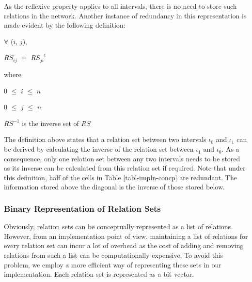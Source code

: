 \documentclass[11pt]{report}
\newenvironment{vquote}
{
  \begin{list}{}{\leftmargin 1em}\item[]
}
{
  \end{list}
}
\begin{document}
        As the reflexive property applies to all intervals, there is no need to
        store such relations in the network. Another instance of redundancy in
        this representation is made evident by the following definition:

        \begin{vquote}
          $\forall$ ($i$, $j$),

          $RS_{ij}$ $=$ $RS^{-1}_{ji}$

          where

          \hspace{1em}
          $0$ $\leq$ $i$ $\leq$ $n$

          \hspace{1em}
          $0$ $\leq$ $j$ $\leq$ $n$

          \hspace{1em}
          $RS^{-1}$ is the inverse set of $RS$
        \end{vquote}

        The definition above states that a relation set between two intervals
        $\iota_0$ and $\iota_1$ can be derived by calculating the inverse of
        the relation set between $\iota_1$ and $\iota_0$. As a consequence,
        only one relation set between any two intervals needs to be stored
        as its inverse can be calculated from this relation set if required.
        Note that under this definition, half of the cells in Table
        \ref{tabl-impln-concp} are redundant. The information stored above the
        diagonal is the inverse of those stored below.

        \subsubsection{Binary Representation of Relation Sets}

          Obviously, relation sets can be conceptually represented as a list of
          relations. However, from an implementation point of view, maintaining
          a list of relations for every relation set can incur a lot of
          overhead as the cost of adding and removing relations from such a
          list can be computationally expensive. To avoid this problem, we
          employ a more efficient way of representing these sets in our
          implementation. Each relation set is represented as a bit
          vector\footnotemark.

\end{document}
